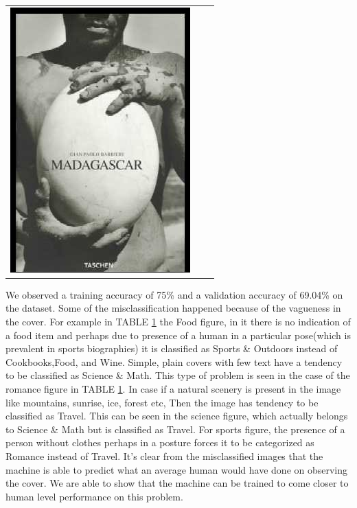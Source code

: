 \documentclass[conference]{IEEEtran}
\begin{document}
\begin{table}[hbtp]
\begin{center}
\begin{tabular}{c c c}
  \includegraphics[scale=0.2]{pics/non_results_images/travel.jpg} \\ 

  \end{tabular}
\end{center}
\label{nontesttab}
\end{table}

We observed a training accuracy of 75\% and a validation accuracy of 69.04\% on the dataset. 
Some of the misclassification happened because of the vagueness in the cover. For example in TABLE \ref{nontesttab} the Food figure, in it there is no indication of a food item and perhaps due to presence of a human in a particular pose(which is prevalent in sports biographies) it is classified as Sports \& Outdoors instead of Cookbooks,Food, and Wine.
Simple, plain covers with few text have a tendency to be classified as Science \& Math. This type of problem is seen in the case of the romance figure in TABLE \ref{nontesttab}.
In case if a natural scenery is present in the image like mountains, sunrise, ice, forest etc, Then the image has tendency to be classified as Travel. This can be seen in the science figure, which actually belongs to Science \& Math but is classified as Travel.
For sports figure, the presence of a person without clothes perhaps in a posture forces it to be categorized as Romance instead of Travel. 
It’s clear from the misclassified images that the machine is able to predict what an average human would have done on observing the cover. We are able to show that the machine can be trained to come closer to human level performance on this problem.
\end{document}
